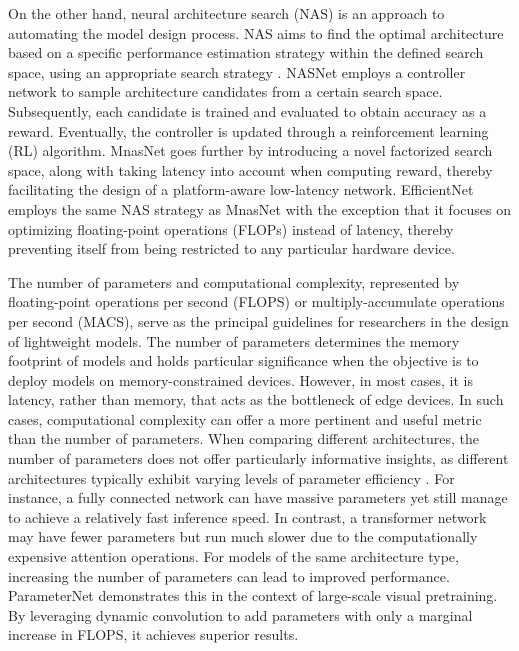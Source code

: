 \documentclass[journal]{IEEEtran}
\begin{document}
On the other hand, neural architecture search (NAS) is an approach to automating the model design process. NAS aims to find the optimal architecture based on a specific performance estimation strategy within the defined search space, using an appropriate search strategy \cite{NAS_survey}. NASNet \cite{NASNet} employs a controller network to sample architecture candidates from a certain search space. Subsequently, each candidate is trained and evaluated to obtain accuracy as a reward. Eventually, the controller is updated through a reinforcement learning (RL) algorithm. MnasNet \cite{MnasNet} goes further by introducing a novel factorized search space, along with taking latency into account when computing reward, thereby facilitating the design of a platform-aware low-latency network. EfficientNet \cite{EfficientNet} employs the same NAS strategy as MnasNet with the exception that it focuses on optimizing floating-point operations (FLOPs) instead of latency, thereby preventing itself from being restricted to any particular hardware device. 

The number of parameters and computational complexity, represented by floating-point operations per second (FLOPS) or multiply-accumulate operations per second (MACS), serve as the principal guidelines for researchers in the design of lightweight models. The number of parameters determines the memory footprint of models and holds particular significance when the objective is to deploy models on memory-constrained devices. However, in most cases, it is latency, rather than memory, that acts as the bottleneck of edge devices. In such cases, computational complexity can offer a more pertinent and useful metric than the number of parameters. When comparing different architectures, the number of parameters does not offer particularly informative insights, as different architectures typically exhibit varying levels of parameter efficiency \cite{SE_scaling}. For instance, a fully connected network can have massive parameters yet still manage to achieve a relatively fast inference speed. In contrast, a transformer network may have fewer parameters but run much slower due to the computationally expensive attention operations. 
For models of the same architecture type, increasing the number of parameters can lead to improved performance. ParameterNet \cite{ParameterNet} demonstrates this in the context of large-scale visual pretraining. By leveraging dynamic convolution to add parameters with only a marginal increase in FLOPS, it achieves superior results.
\end{document}
